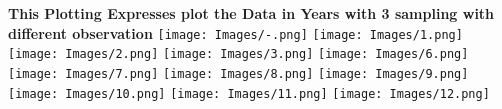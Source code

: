 \documentclass[landscape,17pt]{extarticle}
\begin{document}
\textbf{This Plotting Expresses plot the Data in Years with 3 sampling with different observation }
\texttt{[image: Images/-.png]}
\texttt{[image: Images/1.png]}
\texttt{[image: Images/2.png]}
\texttt{[image: Images/3.png]}
\texttt{[image: Images/6.png]}
\texttt{[image: Images/7.png]}
\texttt{[image: Images/8.png]}
\texttt{[image: Images/9.png]}
\texttt{[image: Images/10.png]}
\texttt{[image: Images/11.png]}
\texttt{[image: Images/12.png]}
\end{document}
